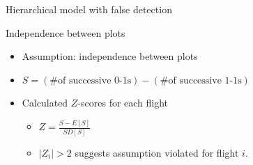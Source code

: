\documentclass{beamer}
\begin{document}
\begin{frame}{Hierarchical model with false detection}
	\begin{center}
	\end{center}
\end{frame}

\begin{frame}{Independence between plots}
	\begin{itemize}
		\item Assumption: independence between plots
		\item $S=(\text{\# of successive 0-1s})-(\text{\# of successive 1-1s})$
		\item Calculated $Z$-scores for each flight
			\begin{itemize}
				\item $Z=\frac{S-E[S]}{SD[S]}$
				\item $|Z_i|>2$ suggests assumption violated for flight $i$.
			\end{itemize}
	\end{itemize}
\end{frame}
\end{document}
